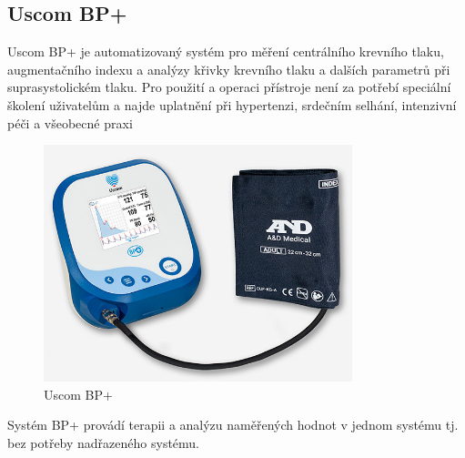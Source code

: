 \subsection{Uscom BP+}
Uscom BP+ je automatizovaný systém pro měření centrálního krevního tlaku, augmentačního indexu a analýzy křivky krevního tlaku a dalších parametrů při suprasystolickém tlaku.
Pro použití a operaci přístroje není za potřebí speciální školení uživatelům a najde uplatnění při hypertenzi, srdečním selhání, intenzivní péči a všeobecné praxi
\cite{cite:Uscom}
\begin{figure}[H]
    \caption{Uscom BP+ \cite{cite:Uscom}}
    \includegraphics[width=0.8\textwidth]{pictures/uscom_bp.jpg}
\end{figure}
Systém BP+ provádí terapii a analýzu naměřených hodnot v jednom systému tj. bez potřeby nadřazeného systému.
\cite{cite:Uscom}
